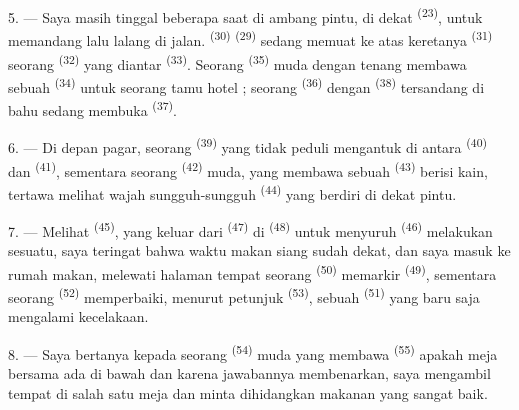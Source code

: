 5. --- Saya masih tinggal beberapa saat di ambang pintu, di dekat
 \textsuperscript{(23)}, untuk memandang lalu lalang
di jalan.  \textsuperscript{(30)} 
\textsuperscript{(29)} sedang memuat ke atas keretanya  \textsuperscript{(31)} seorang 
\textsuperscript{(32)} yang diantar 
\textsuperscript{(33)}. Seorang 
\textsuperscript{(35)} muda dengan tenang membawa sebuah
 \textsuperscript{(34)} untuk seorang tamu hotel ;
seorang  \textsuperscript{(36)} dengan
 \textsuperscript{(38)} tersandang di bahu sedang
membuka  \textsuperscript{(37)}.

\VUsaut{4.0mm}
\VUsaut{3.0mm}

6. --- Di depan pagar, seorang 
\textsuperscript{(39)} yang tidak peduli mengantuk di antara
 \textsuperscript{(40)} dan  \textsuperscript{(41)}, sementara seorang  \textsuperscript{(42)} muda, yang membawa sebuah
 \textsuperscript{(43)} berisi kain, tertawa melihat
wajah sungguh-sungguh  \textsuperscript{(44)}
yang berdiri di dekat pintu.

7. --- Melihat  \textsuperscript{(45)}, yang keluar
dari  \textsuperscript{(47)} di  \textsuperscript{(48)} untuk menyuruh 
\textsuperscript{(46)} melakukan sesuatu, saya teringat bahwa waktu
makan siang sudah dekat, dan saya masuk ke rumah makan, melewati
halaman tempat seorang  \textsuperscript{(50)}
memarkir  \textsuperscript{(49)}, sementara seorang
 \textsuperscript{(52)} memperbaiki, menurut petunjuk
 \textsuperscript{(53)}, sebuah  \textsuperscript{(51)} yang baru saja mengalami
kecelakaan.

8. --- Saya bertanya kepada seorang 
\textsuperscript{(54)} muda yang membawa 
\textsuperscript{(55)} apakah meja bersama ada di bawah
 dan karena jawabannya membenarkan, saya mengambil
tempat di salah satu meja dan minta dihidangkan makanan yang sangat
baik.


